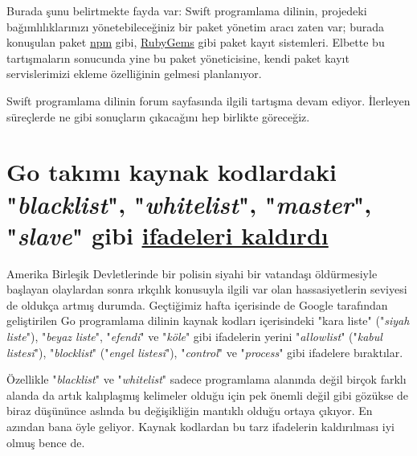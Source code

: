 \documentclass[11pt]{article}
\begin{document}
Burada şunu belirtmekte fayda var: Swift programlama dilinin, projedeki
bağımlılıklarınızı yönetebileceğiniz bir paket yönetim aracı zaten var; burada
konuşulan paket \href{https://www.npmjs.com/}{npm} gibi, \href{https://rubygems.org/}{RubyGems} gibi paket kayıt sistemleri. Elbette bu
tartışmaların sonucunda yine bu paket yöneticisine, kendi paket kayıt
servislerimizi ekleme özelliğinin gelmesi planlanıyor.

Swift programlama dilinin forum sayfasında ilgili tartışma devam ediyor.
İlerleyen süreçlerde ne gibi sonuçların çıkacağını hep birlikte göreceğiz.
\section{Go takımı kaynak kodlardaki "\emph{blacklist}", "\emph{whitelist}", "\emph{master}", "\emph{slave}" gibi \href{https://go-review.googlesource.com/c/go/+/236857/}{ifadeleri kaldırdı}}
\label{sec:org9b39113}
Amerika Birleşik Devletlerinde bir polisin siyahi bir vatandaşı öldürmesiyle
başlayan olaylardan sonra ırkçılık konusuyla ilgili var olan hassasiyetlerin
seviyesi de oldukça artmış durumda. Geçtiğimiz hafta içerisinde de Google
tarafından geliştirilen Go programlama dilinin kaynak kodları içerisindeki
"kara liste" ("\emph{siyah liste}"), "\emph{beyaz liste}", "\emph{efendi}" ve "\emph{köle}" gibi
ifadelerin yerini "\emph{allowlist}" ("\emph{kabul listesi}"), "\emph{blocklist}" ("\emph{engel
listesi}"), "\emph{control}" ve "\emph{process}" gibi ifadelere bıraktılar.

Özellikle "\emph{blacklist}" ve "\emph{whitelist}" sadece programlama alanında değil birçok
farklı alanda da artık kalıplaşmış kelimeler olduğu için pek önemli değil gibi
gözükse de biraz düşününce aslında bu değişikliğin mantıklı olduğu ortaya
çıkıyor. En azından bana öyle geliyor. Kaynak kodlardan bu tarz ifadelerin
kaldırılması iyi olmuş bence de.
\end{document}
